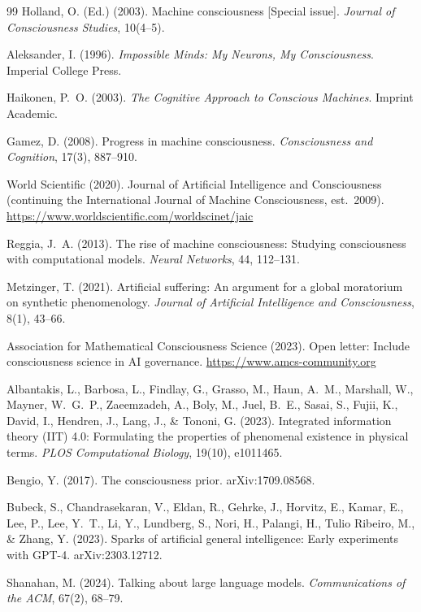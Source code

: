 \documentclass[10pt,fontset=fandol]{ctexart}
\begin{document}
\begin{thebibliography}{99}
Holland, O. (Ed.) (2003).
Machine consciousness [Special issue].
\emph{Journal of Consciousness Studies}, 10(4--5).

Aleksander, I. (1996).
\emph{Impossible Minds: My Neurons, My Consciousness}.
Imperial College Press.

Haikonen, P.~O. (2003).
\emph{The Cognitive Approach to Conscious Machines}.
Imprint Academic.

Gamez, D. (2008).
Progress in machine consciousness.
\emph{Consciousness and Cognition}, 17(3), 887--910.

World Scientific (2020).
Journal of Artificial Intelligence and Consciousness (continuing the International Journal of Machine Consciousness, est.\ 2009).
\url{https://www.worldscientific.com/worldscinet/jaic}

Reggia, J.~A. (2013).
The rise of machine consciousness: Studying consciousness with computational models.
\emph{Neural Networks}, 44, 112--131.

Metzinger, T. (2021).
Artificial suffering: An argument for a global moratorium on synthetic phenomenology.
\emph{Journal of Artificial Intelligence and Consciousness}, 8(1), 43--66.

Association for Mathematical Consciousness Science (2023).
Open letter: Include consciousness science in AI governance.
\url{https://www.amcs-community.org}

Albantakis, L., Barbosa, L., Findlay, G., Grasso, M., Haun, A.~M., Marshall, W., Mayner, W.~G.~P., Zaeemzadeh, A., Boly, M., Juel, B.~E., Sasai, S., Fujii, K., David, I., Hendren, J., Lang, J., \& Tononi, G. (2023).
Integrated information theory (IIT) 4.0: Formulating the properties of phenomenal existence in physical terms.
\emph{PLOS Computational Biology}, 19(10), e1011465.

Bengio, Y. (2017).
The consciousness prior.
arXiv:1709.08568.

Bubeck, S., Chandrasekaran, V., Eldan, R., Gehrke, J., Horvitz, E., Kamar, E., Lee, P., Lee, Y.~T., Li, Y., Lundberg, S., Nori, H., Palangi, H., Tulio Ribeiro, M., \& Zhang, Y. (2023).
Sparks of artificial general intelligence: Early experiments with GPT-4.
arXiv:2303.12712.

Shanahan, M. (2024).
Talking about large language models.
\emph{Communications of the ACM}, 67(2), 68--79.


\end{thebibliography}
\end{document}
